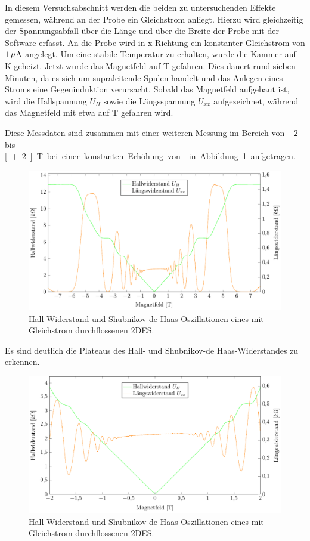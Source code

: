 
In diesem Versuchsabschnitt werden die beiden zu untersuchenden Effekte gemessen, während an der Probe ein Gleichstrom anliegt. Hierzu wird gleichzeitig der Spannungsabfall über die Länge und über die Breite der Probe mit der Software erfasst. An die Probe wird in x-Richtung ein konstanter Gleichstrom von $\unit[1]{\mu A}$ angelegt. Um eine stabile Temperatur zu erhalten, wurde die Kammer auf \unit[2]{K} geheizt. Jetzt wurde das Magnetfeld auf \unit[-7]{T} gefahren. Dies dauert rund sieben Minuten, da es sich um supraleitende Spulen handelt und das Anlegen eines Stroms eine Gegeninduktion verursacht. Sobald das Magnetfeld aufgebaut ist, wird die Hallspannung $U_H$ sowie die Längsspannung $U_{xx}$ aufgezeichnet, während das Magnetfeld mit etwa  auf \unit[7]{T} gefahren wird. 


Diese Messdaten sind zusammen mit einer weiteren Messung im Bereich von $-2$ bis \unit[+2]{T} bei einer konstanten Erhöhung von  in Abbildung~\ref{fig:full_range_dc} aufgetragen.

\begin{figure}[h]
	\centering
	\includegraphics{graphs/dc/full_range.pdf}
	\caption[Gleichstrommessung im maximalen Magnetfeldbereich]{
		Hall-Widerstand und Shubnikov-de Haas Oszillationen eines mit Gleichstrom durchflossenen 2DES.
	}
	\label{fig:full_range_dc}
\end{figure}

Es sind deutlich die Plateaus des Hall- und Shubnikov-de Haas-Widerstandes zu erkennen.


\begin{figure}[h]
	\centering
	\includegraphics{graphs/dc/pm2T_range.pdf}
	\caption[Höher aufgelöste Gleichstrommessung in Magnetfeldteilbereich]{
		Hall-Widerstand und Shubnikov-de Haas Oszillationen eines mit Gleichstrom durchflossenen 2DES.
	}
	\label{fig:2T_range_dc}
\end{figure}